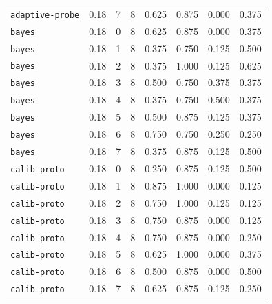 \documentclass{article}
\begin{document}
\begin{center}
{\begin{tabular}{llllcccc}
\texttt{adaptive-probe} & 0.18 & 7 & 8 & 0.625 & 0.875 & 0.000 & 0.375 \\
\texttt{bayes} & 0.18 & 0 & 8 & 0.625 & 0.875 & 0.000 & 0.375 \\
\texttt{bayes} & 0.18 & 1 & 8 & 0.375 & 0.750 & 0.125 & 0.500 \\
\texttt{bayes} & 0.18 & 2 & 8 & 0.375 & 1.000 & 0.125 & 0.625 \\
\texttt{bayes} & 0.18 & 3 & 8 & 0.500 & 0.750 & 0.375 & 0.375 \\
\texttt{bayes} & 0.18 & 4 & 8 & 0.375 & 0.750 & 0.500 & 0.375 \\
\texttt{bayes} & 0.18 & 5 & 8 & 0.500 & 0.875 & 0.125 & 0.375 \\
\texttt{bayes} & 0.18 & 6 & 8 & 0.750 & 0.750 & 0.250 & 0.250 \\
\texttt{bayes} & 0.18 & 7 & 8 & 0.375 & 0.875 & 0.125 & 0.500 \\
\texttt{calib-proto} & 0.18 & 0 & 8 & 0.250 & 0.875 & 0.125 & 0.500 \\
\texttt{calib-proto} & 0.18 & 1 & 8 & 0.875 & 1.000 & 0.000 & 0.125 \\
\texttt{calib-proto} & 0.18 & 2 & 8 & 0.750 & 1.000 & 0.125 & 0.125 \\
\texttt{calib-proto} & 0.18 & 3 & 8 & 0.750 & 0.875 & 0.000 & 0.125 \\
\texttt{calib-proto} & 0.18 & 4 & 8 & 0.750 & 0.875 & 0.000 & 0.250 \\
\texttt{calib-proto} & 0.18 & 5 & 8 & 0.625 & 1.000 & 0.000 & 0.375 \\
\texttt{calib-proto} & 0.18 & 6 & 8 & 0.500 & 0.875 & 0.000 & 0.500 \\
\texttt{calib-proto} & 0.18 & 7 & 8 & 0.625 & 0.875 & 0.125 & 0.250 \\
\bottomrule
\end{tabular}%
}
\end{center}
\end{document}

